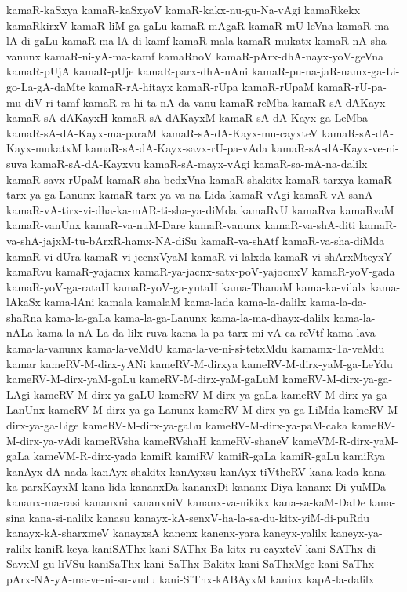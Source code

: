 {kamaR-kaSxya
kamaR-kaSxyoV
kamaR-kakx-nu-gu-Na-vAgi
kamaRkekx
kamaRkirxV
kamaR-liM-ga-gaLu
kamaR-mAgaR
kamaR-mU-leVna
kamaR-ma-lA-di-gaLu
kamaR-ma-lA-di-kamf
kamaR-mala
kamaR-mukatx
kamaR-nA-sha-vanunx
kamaR-ni-yA-ma-kamf
kamaRnoV
kamaR-pArx-dhA-nayx-yoV-geVna
kamaR-pUjA
kamaR-pUje
kamaR-parx-dhA-nAni
kamaR-pu-na-jaR-namx-ga-Li-go-La-gA-daMte
kamaR-rA-hitayx
kamaR-rUpa
kamaR-rUpaM
kamaR-rU-pa-mu-diV-ri-tamf
kamaR-ra-hi-ta-nA-da-vanu
kamaR-reMba
kamaR-sA-dAKayx
kamaR-sA-dAKayxH
kamaR-sA-dAKayxM
kamaR-sA-dA-Kayx-ga-LeMba
kamaR-sA-dA-Kayx-ma-paraM
kamaR-sA-dA-Kayx-mu-cayxteV
kamaR-sA-dA-Kayx-mukatxM
kamaR-sA-dA-Kayx-savx-rU-pa-vAda
kamaR-sA-dA-Kayx-ve-ni-suva
kamaR-sA-dA-Kayxvu
kamaR-sA-mayx-vAgi
kamaR-sa-mA-na-dalilx
kamaR-savx-rUpaM
kamaR-sha-bedxVna
kamaR-shakitx
kamaR-tarxya
kamaR-tarx-ya-ga-Lanunx
kamaR-tarx-ya-va-na-Lida
kamaR-vAgi
kamaR-vA-sanA
kamaR-vA-tirx-vi-dha-ka-mAR-ti-sha-ya-diMda
kamaRvU
kamaRva
kamaRvaM
kamaR-vanUnx
kamaR-va-nuM-Dare
kamaR-vanunx
kamaR-va-shA-diti
kamaR-va-shA-jajxM-tu-bArxR-hamx-NA-diSu
kamaR-va-shAtf
kamaR-va-sha-diMda
kamaR-vi-dUra
kamaR-vi-jecnxVyaM
kamaR-vi-lalxda
kamaR-vi-shArxMteyxY
kamaRvu
kamaR-yajacnx
kamaR-ya-jacnx-satx-poV-yajocnxV
kamaR-yoV-gada
kamaR-yoV-ga-rataH
kamaR-yoV-ga-yutaH
kama-ThanaM
kama-ka-vilalx
kama-lAkaSx
kama-lAni
kamala
kamalaM
kama-lada
kama-la-dalilx
kama-la-da-shaRna
kama-la-gaLa
kama-la-ga-Lanunx
kama-la-ma-dhayx-dalilx
kama-la-nALa
kama-la-nA-La-da-lilx-ruva
kama-la-pa-tarx-mi-vA-ca-reVtf
kama-lava
kama-la-vanunx
kama-la-veMdU
kama-la-ve-ni-si-tetxMdu
kamamx-Ta-veMdu
kamar
kameRV-M-dirx-yANi
kameRV-M-dirxya
kameRV-M-dirx-yaM-ga-LeYdu
kameRV-M-dirx-yaM-gaLu
kameRV-M-dirx-yaM-gaLuM
kameRV-M-dirx-ya-ga-LAgi
kameRV-M-dirx-ya-gaLU
kameRV-M-dirx-ya-gaLa
kameRV-M-dirx-ya-ga-LanUnx
kameRV-M-dirx-ya-ga-Lanunx
kameRV-M-dirx-ya-ga-LiMda
kameRV-M-dirx-ya-ga-Lige
kameRV-M-dirx-ya-gaLu
kameRV-M-dirx-ya-paM-caka
kameRV-M-dirx-ya-vAdi
kameRVsha
kameRVshaH
kameRV-shaneV
kameVM-R-dirx-yaM-gaLa
kameVM-R-dirx-yada
kamiR
kamiRV
kamiR-gaLa
kamiR-gaLu
kamiRya
kanAyx-dA-nada
kanAyx-shakitx
kanAyxsu
kanAyx-tiVtheRV
kana-kada
kana-ka-parxKayxM
kana-lida
kananxDa
kananxDi
kananx-Diya
kananx-Di-yuMDa
kananx-ma-rasi
kananxni
kananxniV
kananx-va-nikikx
kana-sa-kaM-DaDe
kana-sina
kana-si-nalilx
kanasu
kanayx-kA-senxV-ha-la-sa-du-kitx-yiM-di-puRdu
kanayx-kA-sharxmeV
kanayxsA
kanenx
kanenx-yara
kaneyx-yalilx
kaneyx-ya-ralilx
kaniR-keya
kaniSAThx
kani-SAThx-Ba-kitx-ru-cayxteV
kani-SAThx-di-SavxM-gu-liVSu
kaniSaThx
kani-SaThx-Bakitx
kani-SaThxMge
kani-SaThx-pArx-NA-yA-ma-ve-ni-su-vudu
kani-SiThx-kABAyxM
kaninx
kapA-la-dalilx
}
